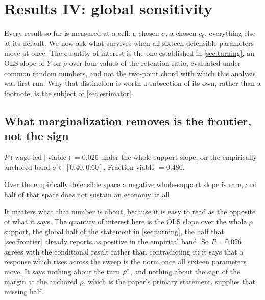 
\section{Results IV: global sensitivity}
\label{sec:sa}

Every result so far is measured at a cell: a chosen $\sigma$, a chosen
$c_0$, everything else at its default. We now ask what survives when all
sixteen defensible parameters move at once. The quantity of interest is the
one established in \cref{sec:turning}, an OLS slope of $Y$ on $\rho$ over
four values of the retention ratio, evaluated under common random numbers, 
and not the two-point chord with which this analysis was first run. Why that
distinction is worth a subsection of its own, rather than a footnote, is the
subject of \cref{sec:estimator}.

\subsection{What marginalization removes is the frontier, not the sign}
\label{sec:whatfails}

\begin{remark}
$P(\text{wage-led} \mid \text{viable}) = 0.026$ under the whole-support
slope, on the empirically anchored band $\sigma \in [0.40, 0.60]$.
Fraction viable $= 0.480$.

\smallskip
Over the empirically defensible space a negative whole-support slope is rare,
and half of that space does not sustain an economy at all.
\end{remark}

It matters what that number is about, because it is easy to read as the
opposite of what it says. The quantity of interest here is the OLS slope
over the whole $\rho$ support, the global half of the statement in
\cref{sec:turning}, the half that \cref{sec:frontier} already reports as
positive in the empirical band. So $P = 0.026$ agrees with the
conditional result rather than contradicting it: it says that a response which
rises across the sweep is the norm once all sixteen parameters move. It says
nothing about the turn $\rho^{\ast}$, and nothing about the sign of the margin at
the anchored $\rho$, which is the paper's primary statement.
 supplies that missing half.


